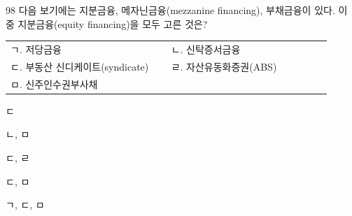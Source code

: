 \begin{question}{98}
다음 보기에는 지분금융, 메자닌금융(mezzanine financing), 부채금융이 있다. 이 중 지분금융(equity financing)을 모두 고른 것은?
\begin{framedtext}
\begin{tabular}{@{}p{0.46\linewidth}p{0.46\linewidth}@{}}
ㄱ. 저당금융 & ㄴ. 신탁증서금융 \\
ㄷ. 부동산 신디케이트(syndicate) & ㄹ. 자산유동화증권(ABS) \\
ㅁ. 신주인수권부사채 &  \\
\end{tabular}
\end{framedtext}
\begin{choices}
  \item ㄷ
  \item ㄴ, ㅁ
  \item ㄷ, ㄹ
  \item ㄷ, ㅁ
  \item ㄱ, ㄷ, ㅁ
\end{choices}
\end{question}
